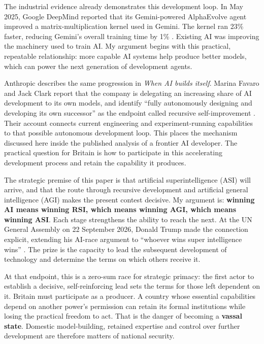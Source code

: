 The industrial evidence already demonstrates this development loop. In May
2025, Google DeepMind reported that its Gemini-powered AlphaEvolve agent
improved a matrix-multiplication kernel used in Gemini. The kernel ran
23\% faster, reducing Gemini's overall training time by 1\%
\cite{alphaevolve2025}. Existing AI was improving the machinery used to
train AI. My argument begins with this practical, repeatable relationship:
more capable AI systems help produce better models, which can power the
next generation of development agents.

Anthropic describes the same progression in \emph{When AI builds itself}.
Marina Favaro and Jack Clark report that the company is delegating an
increasing share of AI development to its own models, and identify
``fully autonomously designing and developing its own successor'' as the
endpoint called recursive self-improvement \cite{anthropicrsi2026}.
Their account connects current engineering and experiment-running
capabilities to that possible autonomous development loop. This places
the mechanism discussed here inside the published analysis of a frontier
AI developer. The practical question for Britain is how to participate
in this accelerating development process and retain the capability it
produces.

\begin{samepage}
The strategic premise of this paper is that artificial superintelligence
(ASI) will arrive, and that the route through recursive development and
artificial general intelligence (AGI) makes the present contest decisive.
My argument is: \textbf{winning AI means winning RSI, which means winning
AGI, which means winning ASI}. Each stage strengthens the ability to reach the next. At the UN General
Assembly on 22 September 2026, Donald Trump made the connection explicit,
extending his AI-race argument to ``whoever wins super intelligence wins''
\cite{trumpunga2026}.
The prize is the capacity to lead the subsequent development of technology
and determine the terms on which others receive it.
\par\end{samepage}

At that endpoint, this is a zero-sum race for strategic primacy: the first
actor to establish a decisive, self-reinforcing lead sets the terms for
those left dependent on it. Britain must participate as a producer. A
country whose essential capabilities depend on another power's permission
can retain its formal institutions while losing the practical freedom to
act. That is the danger of becoming a \textbf{vassal state}. Domestic
model-building, retained expertise and control over further development
are therefore matters of national security.


